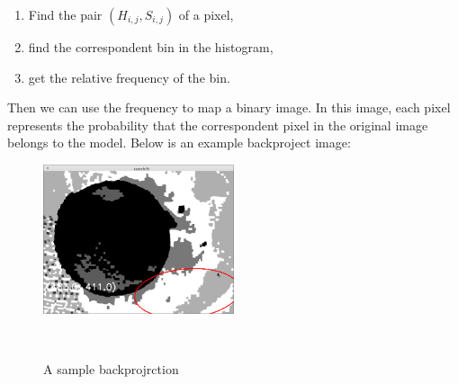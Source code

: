 \begin{enumerate}
  \item Find the pair $(H_{i,j},S_{i,j})$ of a pixel,
  \item find the correspondent bin in the histogram,
  \item get the relative frequency of the bin.
\end{enumerate}
Then we can use the frequency to map a binary image. In this image, each pixel represents the probability that the correspondent pixel in the original image belongs to the model. Below is an example backproject image:\\
\begin{figure}[h!]

  \centering
    \includegraphics[width=0.5\textwidth]{../Pictures/backproject.png}
    \caption{A sample backprojrction}\\
\end{figure}

